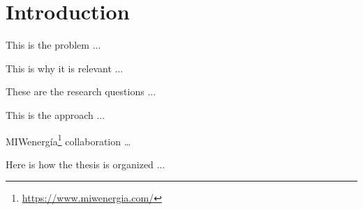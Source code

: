 \chapter{Introduction}
\label{cha:intro}
\vspace{0.4 cm}

This is the problem ...

This is why it is relevant ...

These are the research questions ...

This is the approach ...

MIWenergía\footnote{ \url{https://www.miwenergia.com/} } collaboration …

Here is how the thesis is organized ...
